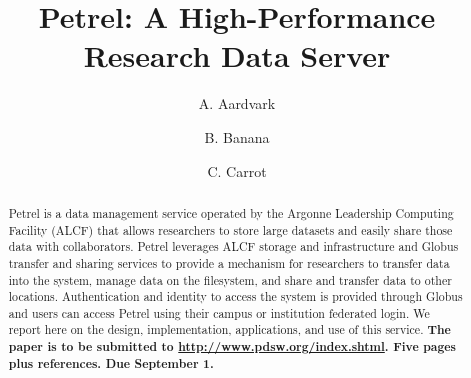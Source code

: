 \documentclass[sigconf]{acmart}
\begin{document}
\title{Petrel: A High-Performance Research Data Server}

\author{A. Aardvark}

\author{B. Banana}

\author{C. Carrot}

%
%
%

\renewcommand{\shortauthors}{A. Aardvark et al.}


\begin{abstract}
Petrel is a data management service operated by the Argonne Leadership Computing Facility (ALCF)
that allows researchers to store large datasets and easily share those data with collaborators. 
Petrel leverages ALCF
storage and infrastructure and Globus transfer and sharing services to provide a mechanism for researchers to transfer data into the system, manage data on the filesystem, and share and transfer data to other locations. Authentication and identity to access the system is provided through Globus and users can access Petrel using their campus or institution federated login.
We report here on the design, implementation, applications, and use of this service.
\textbf{The paper is to be submitted to \url{http://www.pdsw.org/index.shtml}. Five pages plus references. Due September 1.}
\end{abstract}
\end{document}
